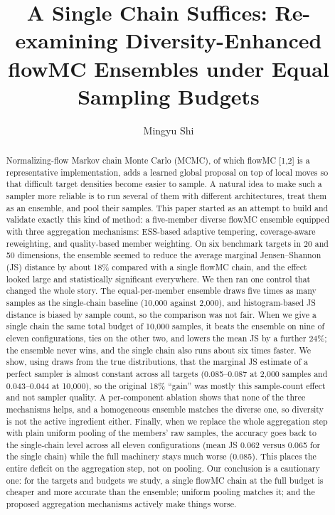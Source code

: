 \documentclass[11pt]{article}
\title{\textbf{A Single Chain Suffices: Re-examining Diversity-Enhanced
flowMC Ensembles under Equal Sampling Budgets}}
\author[1]{Mingyu Shi}
\affil[1]{Independent Researcher}
\date{}
\begin{document}
\maketitle

\begin{abstract}
\noindent
Normalizing-flow Markov chain Monte Carlo (MCMC), of which flowMC [1,2] is a
representative implementation, adds a learned global proposal on top of local
moves so that difficult target densities become easier to sample. A natural
idea to make such a sampler more reliable is to run several of them with
different architectures, treat them as an ensemble, and pool their samples.
This paper started as an attempt to build and validate exactly this kind of
method: a five-member diverse flowMC ensemble equipped with three aggregation
mechanisms: ESS-based adaptive tempering, coverage-aware reweighting, and
quality-based member weighting. On six benchmark targets in 20 and 50
dimensions, the ensemble seemed to reduce the average marginal
Jensen--Shannon (JS) distance by about 18\% compared with a single flowMC
chain, and the effect looked large and statistically significant everywhere.
We then ran one control that changed the whole story. The equal-per-member
ensemble draws five times as many samples as the single-chain baseline
(10,000 against 2,000), and histogram-based JS distance is biased by sample
count, so the comparison was not fair. When we give a single chain the same
total budget of 10,000 samples, it beats the ensemble on nine of eleven
configurations, ties on the other two, and lowers the mean JS by a further
24\%; the ensemble never wins, and the single chain also runs about six
times faster. We show, using draws from the true distributions, that the
marginal JS estimate of a perfect sampler is almost constant across all
targets (0.085--0.087 at 2,000 samples and 0.043--0.044 at 10,000), so the
original 18\% ``gain'' was mostly this sample-count effect and not sampler
quality. A per-component ablation shows that none of the three mechanisms
helps, and a homogeneous ensemble matches the diverse one, so diversity is
not the active ingredient either. Finally, when we replace the whole
aggregation step with plain uniform pooling of the members' raw samples, the
accuracy goes back to the single-chain level across all eleven configurations
(mean JS 0.062 versus 0.065 for the single chain) while the full machinery
stays much worse (0.085). This places the entire deficit on the aggregation
step, not on pooling. Our conclusion is a cautionary one: for the targets and
budgets we study, a single flowMC chain at the full budget is cheaper and
more accurate than the ensemble; uniform pooling matches it; and the proposed
aggregation mechanisms actively make things worse.
\end{abstract}
\end{document}
